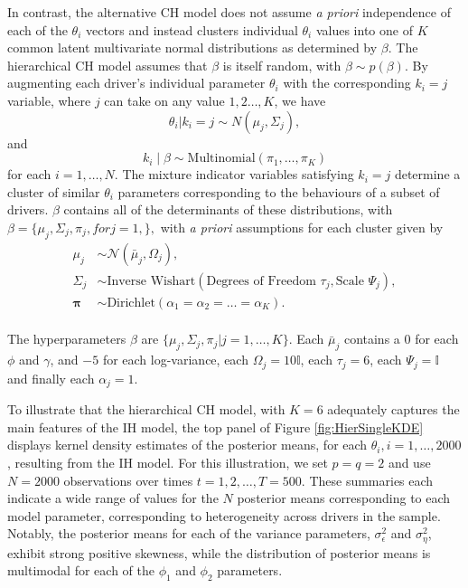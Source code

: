 \documentclass[12pt,a4paper]{article}\usepackage[]{graphicx}\usepackage[]{color}
\begin{document}
In contrast, the alternative CH model does not assume \textit{a priori} independence of each of the $\theta_i$ vectors and instead clusters individual $\theta_i$ values into one of $K$ common latent multivariate normal distributions as determined by $\beta.$ The hierarchical CH model assumes that $\beta$ is itself random, with $\beta \sim p(\beta)$. By augmenting each driver's individual parameter $\theta_i$ with the corresponding $k_i=j$ variable, where $j$ can take on any value $1,2 \ldots, K$, we have
\begin{equation}
\label{mixPrior}
\theta_i | k_i = j \sim N(\mu_j, \Sigma_j),
\end{equation}
and
\begin{equation}
k_i \mid \beta \sim \mbox{Multinomial}\left(\pi_1, \dots, \pi_{K}\right)
\end{equation}
for each $i = 1, \dots, N$. The mixture indicator variables satisfying $k_i=j$ determine a cluster of similar $\theta_i$ parameters corresponding to the behaviours of a subset of drivers. $\beta$ contains all of the determinants of these distributions, with $\beta = \{\mu_j,\Sigma_j, \pi_j, for j=1,\},$ with \textit{a priori} assumptions for each cluster given by  
\begin{align}
\mu_j &\sim \mathcal{N}\left(\bar{\mu}_j, \Omega_j\right), \\
\Sigma_j &\sim \mbox{Inverse Wishart}\left(\mbox{Degrees of Freedom } \tau_j, \mbox{Scale } \Psi_j\right), \\
\boldsymbol{\pi} &\sim \mbox{Dirichlet}\left(\alpha_1 = \alpha_2 = \dots = \alpha_K\right).
\end{align}
\\

The hyperparameters $\beta$ are $\{\mu_j, \Sigma_j, \pi_j | j = 1, \dots, K\}$. Each $\bar{\mu}_j$ contains a $0$ for each $\phi$ and $\gamma$, and $-5$ for each log-variance, each $\Omega_j = 10 \mathbb{I}$, each $\tau_j = 6$, each $\Psi_j = \mathbb{I}$ and finally each $\alpha_j = 1$. 

To illustrate that the hierarchical CH model, with $K=6$ adequately captures the main features of the IH model, the top panel of Figure \ref{fig:HierSingleKDE} displays kernel density estimates of the posterior means, for each $\theta_i, i = 1, \dots, 2000$, resulting from the IH model. For this illustration, we set $p = q = 2$ and use $N=2000$ observations over times $t=1, 2, \ldots, T = 500$. These summaries each indicate a wide range of values for the $N$ posterior means corresponding to each model parameter, corresponding to heterogeneity across drivers in the sample. Notably, the posterior means for each of the variance parameters, $\sigma^2_{\epsilon}$ and $\sigma^2_{\eta}$, exhibit strong positive skewness, while the distribution of posterior means is multimodal for each of the $\phi_1$ and $\phi_2$ parameters.
\end{document}
